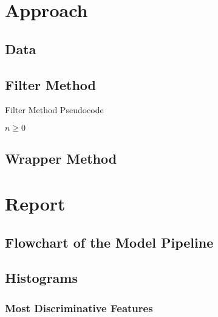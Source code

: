 \documentclass[12pt,twoside,a4paper]{article}
\begin{document}
\section{Approach}

\subsection{Data}


\subsection{Filter Method}

\begin{algorithm}
\caption{Filter Method Pseudocode}\label{alg:fmp}
\begin{algorithmic}

\Require $n \geq 0$

\vspace{-20pt}
\end{algorithmic}
\end{algorithm}

\subsection{Wrapper Method}

\section{Report}

\subsection{Flowchart of the Model Pipeline}

\subsection{Histograms}

\subsubsection{Most Discriminative Features}
\end{document}
